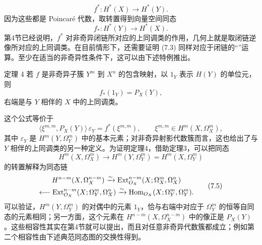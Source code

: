 \begin{equation}
f^*:H^*(X)\longrightarrow H^*(Y).\tag{7.2}
\end{equation}
因为这些都是 Poincaré 代数，取转置得到向量空间同态
\begin{equation}
f_*:H^*(Y)\longrightarrow H^*(X).\tag{7.3}
\end{equation}
第4节已经说明，$f^*$ 对非奇异闭链所对应的上同调类的作用，几何上就是取闭链逆像所对应的上同调类。在目前情形下，还需要证明 (7.3) 同样对应于闭链的“”运算。至少在适当的非奇异性条件下，这可以由下述特例推出。
\begin{statement}{定理 4}
若 $f$ 是非奇异子簇 $Y^m$ 到 $X^n$ 的包含映射，以 $1_Y$ 表示 $H(Y)$ 的单位元，则
\begin{equation}
f_*(1_Y)=P_X(Y),\tag{7.4}
\end{equation}
右端是与 $Y$ 相伴的 $X$ 中的上同调类。
\end{statement}
这个公式等价于
\begin{equation}
\langle\xi^{m,m},P_X(Y)\rangle\,\varepsilon_Y=f^*(\xi^{m,m}),
\qquad \xi^{m,m}\in H^m(X,\Omega_X^m),\tag{7.4 bis}
\end{equation}
其中 $\varepsilon_Y$ 是 $H^m(Y,\Omega_Y^m)$ 中的基本元素；对非奇异射影代数簇而言，这也给出了与 $Y$ 相伴的上同调类的另一种定义。为证明定理4，借助定理3，可以把同态
\[
H^m(X,\Omega_X^m)\longrightarrow H^m(Y,\Omega_Y^m)=H^m(X,\Omega_Y^m)
\]
的转置解释为同态链
\begin{equation}
\begin{gathered}
H^{n-m}(X,\Omega_X^{n-m})\xrightarrow{\sim}
\operatorname{Ext}_{O_X}^{n-m}(X;\Omega_X^m,\Omega_X^n)\\
\longleftarrow\operatorname{Ext}_{O_X}^{n-m}(X;\Omega_Y^m,\Omega_X^n)
\xrightarrow{\sim}\operatorname{Hom}_{O_X}(X;\Omega_Y^m,\Omega_Y^m).
\end{gathered}\tag{7.5}
\end{equation}
可以验证，$H^m(Y,\Omega_Y^m)$ 的对偶中的元素 $1_Y$，恰与右端中对应于 $\Omega_Y^m$ 的恒等自同态的元素相同；另一方面，这个元素在 $H^{n-m}(X,\Omega_X^{n-m})$ 中的像正是 $P_X(Y)$。这些相容性其实在第4节就可以提出，而且对任意非奇异代数簇都成立；例如第二个相容性由下述典范同态图的交换性得到。


